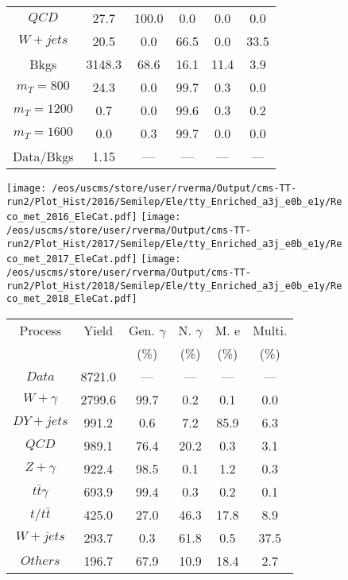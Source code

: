 \begin{figure}
\begin{minipage}[c]{0.32\textwidth}
{\begin{tabular}{cccccc}
$ QCD $ &  27.7 &  100.0 &  0.0 &  0.0 &  0.0\\
$ W+jets $ &  20.5 &  0.0 &  66.5 &  0.0 &  33.5\\
Bkgs &  3148.3 &  68.6 &  16.1 &  11.4 &  3.9\\
$ m_{T} = 800 $ &  24.3 &  0.0 &  99.7 &  0.3 &  0.0\\
$ m_{T} = 1200 $ &  0.7 &  0.0 &  99.6 &  0.3 &  0.2\\
$ m_{T} = 1600 $ &  0.0 &  0.3 &  99.7 &  0.0 &  0.0\\
Data/Bkgs &  1.15 &  --- &  --- &  --- &  ---\\
\hline
\end{tabular}
}
\end{minipage}
\end{figure}

\begin{figure}
\centering
\texttt{[image: /eos/uscms/store/user/rverma/Output/cms-TT-run2/Plot\_Hist/2016/Semilep/Ele/tty\_Enriched\_a3j\_e0b\_e1y/Reco\_met\_2016\_EleCat.pdf]}
\texttt{[image: /eos/uscms/store/user/rverma/Output/cms-TT-run2/Plot\_Hist/2017/Semilep/Ele/tty\_Enriched\_a3j\_e0b\_e1y/Reco\_met\_2017\_EleCat.pdf]}
\texttt{[image: /eos/uscms/store/user/rverma/Output/cms-TT-run2/Plot\_Hist/2018/Semilep/Ele/tty\_Enriched\_a3j\_e0b\_e1y/Reco\_met\_2018\_EleCat.pdf]}
\begin{minipage}[c]{0.32\textwidth}
\centering
\tiny{
\begin{tabular}{cccccc}
\hline
Process & Yield & Gen. $\gamma$ & N. $\gamma$ & M. e & Multi. \\
 &  & (\%) & (\%) & (\%) & (\%)  \\
\hline
                                                                      $ Data $ &  8721.0 &  --- &  --- &  --- &  ---\\
$ W+\gamma $ &  2799.6 &  99.7 &  0.2 &  0.1 &  0.0\\
$ DY+jets $ &  991.2 &  0.6 &  7.2 &  85.9 &  6.3\\
$ QCD $ &  989.1 &  76.4 &  20.2 &  0.3 &  3.1\\
$ Z+\gamma $ &  922.4 &  98.5 &  0.1 &  1.2 &  0.3\\
$ t\bar{t}\gamma $ &  693.9 &  99.4 &  0.3 &  0.2 &  0.1\\
$ t/t\bar{t} $ &  425.0 &  27.0 &  46.3 &  17.8 &  8.9\\
$ W+jets $ &  293.7 &  0.3 &  61.8 &  0.5 &  37.5\\
$ Others $ &  196.7 &  67.9 &  10.9 &  18.4 &  2.7\\

\end{tabular}}
\end{minipage}
\end{figure}
